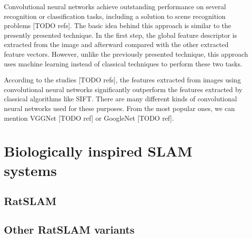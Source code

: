 Convolutional neural networks achieve outstanding performance on several recognition or classification tasks, including a solution to scene recognition problems [TODO refs]. The basic idea behind this approach is similar to the presently presented technique. In the first step, the global feature descriptor is extracted from the image and afterward compared with the other extracted feature vectors. However, unlike the previously presented technique, this approach uses machine learning instead of classical techniques to perform these two tasks.\par
According to the studies [TODO refs], the features extracted from images using convolutional neural networks significantly outperform the features extracted by classical algorithms like SIFT. There are many different kinds of convolutional neural networks used for these purposes. From the most popular ones, we can mention VGGNet [TODO ref] or GoogleNet [TODO ref].

\section{Biologically inspired SLAM systems}

\subsection{RatSLAM}

\subsection{Other RatSLAM variants}